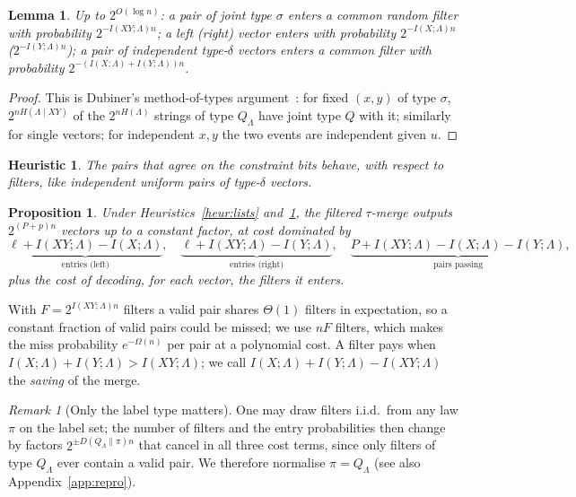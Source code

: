 \documentclass[11pt]{article}
\newtheorem{lemma}[theorem]{Lemma}
\newtheorem{proposition}[theorem]{Proposition}
\newtheorem{heuristic}{Heuristic}
\theoremstyle{definition}
\theoremstyle{remark}
\newtheorem{remark}[theorem]{Remark}
\begin{document}
\begin{lemma}\label{lem:filter}
Up to $2^{O(\log n)}$: a pair of joint type $\sigma$ enters a common random filter with probability
$2^{-I(XY;\Lambda)n}$; a left (right) vector enters with probability $2^{-I(X;\Lambda)n}$ ($2^{-I(Y;\Lambda)n}$); a
pair of independent type-$\delta$ vectors enters a common filter with probability $2^{-(I(X;\Lambda)+I(Y;\Lambda))n}$.
\end{lemma}
\begin{proof}
This is Dubiner's method-of-types argument~\cite{Dub10}: for fixed $(x,y)$ of type $\sigma$, $2^{nH(\Lambda\mid XY)}$ of the
$2^{nH(\Lambda)}$ strings of type $Q_\Lambda$ have joint type $Q$ with it; similarly for single vectors; for
independent $x,y$ the two events are independent given $u$.
\end{proof}

\begin{heuristic}\label{heur:filter}
The pairs that agree on the constraint bits behave, with respect to filters, like independent uniform pairs of
type-$\delta$ vectors.
\end{heuristic}

\begin{proposition}\label{prop:cost}
Under Heuristics~\ref{heur:lists} and~\ref{heur:filter}, the filtered $\tau$-merge outputs $2^{(P+p)n}$ vectors up to a
constant factor, at cost dominated by
\[
\underbrace{\ell+I(XY;\Lambda)-I(X;\Lambda)}_{\text{entries (left)}},\quad
\underbrace{\ell+I(XY;\Lambda)-I(Y;\Lambda)}_{\text{entries (right)}},\quad
\underbrace{P+I(XY;\Lambda)-I(X;\Lambda)-I(Y;\Lambda)}_{\text{pairs passing}},
\]
plus the cost of decoding, for each vector, the filters it enters.
\end{proposition}
With $F=2^{I(XY;\Lambda)n}$ filters a valid pair shares $\Theta(1)$ filters in expectation, so a constant
fraction of valid pairs could be missed; we use $nF$ filters, which makes the miss probability $e^{-\Omega(n)}$ per
pair at a polynomial cost. A filter pays when $I(X;\Lambda)+I(Y;\Lambda)>I(XY;\Lambda)$; we call $I(X;\Lambda)+I(Y;\Lambda)-I(XY;\Lambda)$ the
\emph{saving} of the merge.

\begin{remark}[Only the label type matters]\label{rem:piQ}
One may draw filters i.i.d.\ from any law $\pi$ on the label set; the number of filters and the entry probabilities
then change by factors $2^{\pm D(Q_\Lambda\|\pi)n}$ that cancel in all three cost terms, since only filters of type
$Q_\Lambda$ ever contain a valid pair. We therefore normalise $\pi=Q_\Lambda$ (see also Appendix~\ref{app:repro}).
\end{remark}
\end{document}
